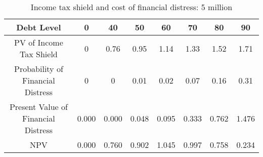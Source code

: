 \begin{table}[ht]
\centering
\begin{tabular}{@{}cccccccc@{}}
\toprule
Debt Level                          & 0     & 40    & 50    & 60    & 70    & 80    & 90    \\ \midrule
PV of Income Tax Shield             & 0     & 0.76  & 0.95  & 1.14  & 1.33  & 1.52  & 1.71  \\
Probability of Financial Distress   & 0     & 0     & 0.01  & 0.02  & 0.07  & 0.16  & 0.31  \\
Present Value of Financial Distress & 0.000 & 0.000 & 0.048 & 0.095 & 0.333 & 0.762 & 1.476 \\
NPV                                 & 0.000 & 0.760 & 0.902 & 1.045 & 0.997 & 0.758 & 0.234 \\ \bottomrule
\end{tabular}
\caption{Income tax shield and cost of financial distress: 5 million}
\label{tab:prob4-5mil}
\end{table}

